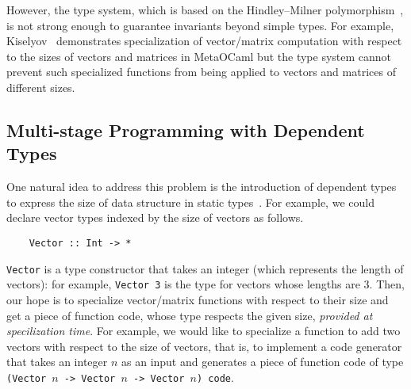
However, the type system, which is based on the Hindley--Milner
polymorphism~\cite{Milner78JCSS}, is not strong enough to guarantee
invariants beyond simple types.  For example, Kiselyov~\cite{8384206}
demonstrates specialization of vector/matrix computation with respect
to the sizes of vectors and matrices in MetaOCaml but the type system
cannot prevent such specialized functions from being applied to
vectors and matrices of different sizes.




\subsection{Multi-stage Programming with Dependent Types}


One natural idea to address this problem is the introduction of dependent types
to express the size of data structure in static types~\cite{Xi98}.
For example, we could declare vector types indexed by the size of
vectors as follows.
\begin{verbatim}
    Vector :: Int -> *
\end{verbatim}
\verb|Vector| is a type constructor that takes an integer (which
represents the length of vectors): for example, \verb|Vector 3| is the
type for vectors whose lengths are 3.  Then, our hope is to specialize
vector/matrix functions with respect to their size and get a piece of
function code, whose type respects the given size, \emph{provided at
  specilization time}.  For example, we would like to specialize a
function to add two vectors with respect to the size of vectors, that
is, to implement a code generator that takes an integer $n$ as an
input and generates a piece of function code of type
\verb|(Vector |$n$\verb| -> Vector |$n$\verb| -> Vector |$n$\verb|) code|.

